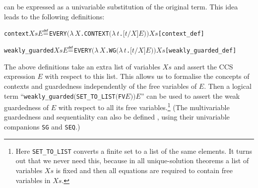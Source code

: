\documentclass[GCNS]{yincog}
\renewcommand{\HOLinline}[1]{\mbox{\textup{\texttt{#1}}}}
\renewcommand{\HOLConst}[1]{\texttt{#1}}
\renewcommand{\HOLBoundVar}[1]{\ensuremath{\mathit{#1}}}
\renewcommand{\HOLFreeVar}[1]{\ensuremath{\mathit{#1}}}
\renewcommand{\HOLTokenDefEquality}{\ensuremath{\mathrel{\overset{\makebox [0pt]{\text{\tiny \textsf{def}}}}{=}}}}
\renewcommand{\HOLTokenLambda}{\ensuremath{\lambda \,}}
\theoremstyle{remark}
\theoremstyle{theorem}
\theoremstyle{remark}
\newcommand{\univariate}{univariable\xspace}
\newcommand{\multivariate}{multivariable\xspace}
\begin{document}
can be expressed as a \univariate substitution of the original term. This
idea leads to the following definitions:
%
\begin{alltt}
   \HOLConst{context} \HOLFreeVar{Xs} \HOLFreeVar{E} \HOLTokenDefEquality{} \HOLConst{EVERY} \ensuremath{(}\HOLTokenLambda{}\HOLBoundVar{X}. \HOLConst{CONTEXT} \ensuremath{(}\HOLTokenLambda{}\HOLBoundVar{t}. \ensuremath{[}\HOLBoundVar{t}\ensuremath{/}\HOLBoundVar{X}\ensuremath{]} \HOLFreeVar{E}\ensuremath{)}\ensuremath{)} \HOLFreeVar{Xs}\hfill{[context\_def]}
\end{alltt}

\begin{alltt}
   \HOLConst{weakly\_guarded} \HOLFreeVar{Xs} \HOLFreeVar{E} \HOLTokenDefEquality{} \HOLConst{EVERY} \ensuremath{(}\HOLTokenLambda{}\HOLBoundVar{X}. \HOLConst{WG} \ensuremath{(}\HOLTokenLambda{}\HOLBoundVar{t}. \ensuremath{[}\HOLBoundVar{t}\ensuremath{/}\HOLBoundVar{X}\ensuremath{]} \HOLFreeVar{E}\ensuremath{)}\ensuremath{)} \HOLFreeVar{Xs}\hfill{[weakly\_guarded\_def]}
\end{alltt}
%
The above definitions take an extra list of variables
\HOLinline{\HOLFreeVar{Xs}} and assert the CCS expression
\HOLinline{\HOLFreeVar{E}} with respect to this list. This allows us to
formalise the concepts of contexts and guardedness independently of the
free variables of \HOLinline{\HOLFreeVar{E}}. Then a logical term ``\HOLinline{\HOLConst{weakly\_guarded}\\\;\ensuremath{(}\HOLConst{SET\_TO\_LIST}\\\;\ensuremath{(}\HOLConst{FV}\\\;\HOLFreeVar{E}\ensuremath{)}\ensuremath{)}\\\;\HOLFreeVar{E}}''
can be used to assert the weak guardedness of $E$ with respect to all its
free variables.\footnote{Here \HOLinline{\HOLConst{SET\_TO\_LIST}} converts
a finite set to a list of the same elements. It turns out that we never
need this, because in all unique-solution theorems a list of variables
\HOLinline{\HOLFreeVar{Xs}} is fixed and then all equations are required
to contain free variables in \HOLinline{\HOLFreeVar{Xs}}.} (The
\multivariate guardedness and sequentiality can also be defined ,
using their \univariate companions \HOLinline{\HOLConst{SG}} and
\HOLinline{\HOLConst{SEQ}}.)
\end{document}
